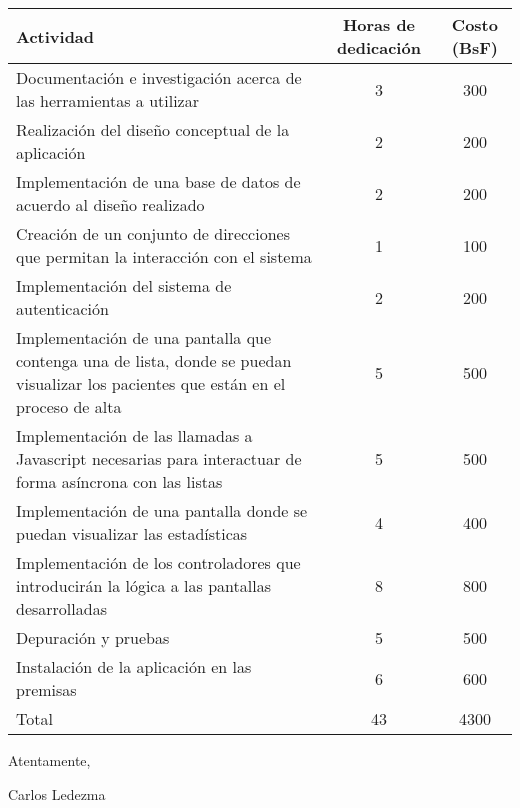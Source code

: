 \documentclass[9pt, letterpaper, oneside]{report}
\begin{document}
  \begin{tabular}{p{} | c | c}
    Actividad & Horas de dedicación & Costo (BsF) \\
    \hline
      Documentación e investigación acerca de las herramientas a utilizar &
      3 &
      300 \\
    \hline
      Realización del diseño conceptual de la aplicación &
      2 &
      200 \\
    \hline
      Implementación de una base de datos de acuerdo al diseño realizado &
      2 &
      200 \\
    \hline
      Creación de un conjunto de direcciones que permitan la interacción con el
        sistema &
      1 &
      100 \\
    \hline
      Implementación del sistema de autenticación &
      2 &
      200 \\
    \hline
      Implementación de una pantalla que contenga una de lista, donde se puedan
        visualizar los pacientes que están en el proceso de alta &
      5 &
      500 \\
    \hline
      Implementación de las llamadas a Javascript necesarias para interactuar de
        forma asíncrona con las listas &
      5 &
      500 \\
    \hline
      Implementación de una pantalla donde se puedan visualizar las
        estadísticas &
      4 &
      400 \\
    \hline
      Implementación de los controladores que introducirán la lógica a las
        pantallas desarrolladas &
      8 &
      800 \\
    \hline
      Depuración y pruebas &
      5 &
      500 \\
    \hline
      Instalación de la aplicación en las premisas &
      6 &
      600 \\
    \hline
      Total &
      43 &
      4300 \\
  \end{tabular}

  \vspace{10mm}

  Atentamente,

  \vspace{20mm}

  Carlos Ledezma
\end{document}
